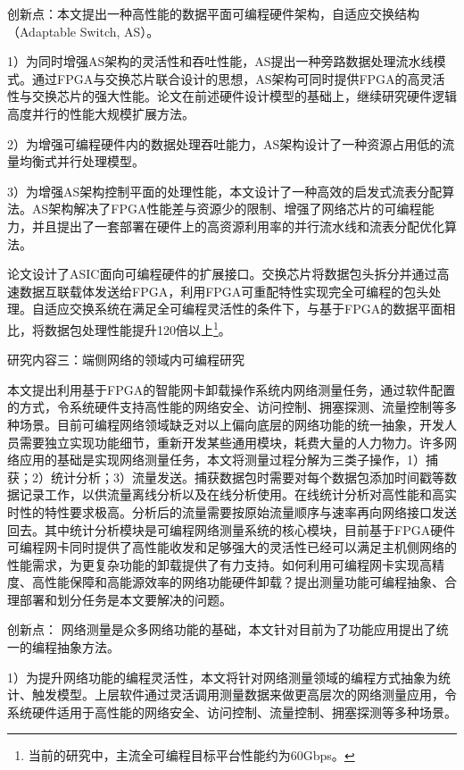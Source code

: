 {\hei 创新点：}本文提出一种高性能的数据平面可编程硬件架构，自适应交换结构（Adaptable Switch, AS）。

1）为同时增强AS架构的灵活性和吞吐性能，AS提出一种旁路数据处理流水线模式。通过FPGA与交换芯片联合设计的思想，AS架构可同时提供FPGA的高灵活性与交换芯片的强大性能。论文在前述硬件设计模型的基础上，继续研究硬件逻辑高度并行的性能大规模扩展方法。

2）为增强可编程硬件内的数据处理吞吐能力，AS架构设计了一种资源占用低的流量均衡式并行处理模型。

3）为增强AS架构控制平面的处理性能，本文设计了一种高效的启发式流表分配算法。AS架构解决了FPGA性能差与资源少的限制、增强了网络芯片的可编程能力，并且提出了一套部署在硬件上的高资源利用率的并行流水线和流表分配优化算法。

论文设计了ASIC面向可编程硬件的扩展接口。交换芯片将数据包头拆分并通过高速数据互联载体发送给FPGA，利用FPGA可重配特性实现完全可编程的包头处理。自适应交换系统在满足全可编程灵活性的条件下，与基于FPGA的数据平面相比，将数据包处理性能提升120倍以上\footnote{当前的研究中，主流全可编程目标平台性能约为60Gbps。}。

{\hei 研究内容三：端侧网络的领域内可编程研究}

{\hei 本文提出利用基于FPGA的智能网卡卸载操作系统内网络测量任务，通过软件配置的方式，令系统硬件支持高性能的网络安全、访问控制、拥塞探测、流量控制等多种场景。}目前可编程网络领域缺乏对以上偏向底层的网络功能的统一抽象，开发人员需要独立实现功能细节，重新开发某些通用模块，耗费大量的人力物力。许多网络应用的基础是实现网络测量任务，本文将测量过程分解为三类子操作，1）捕获；2）统计分析；3）流量发送。捕获数据包时需要对每个数据包添加时间戳等数据记录工作，以供流量离线分析以及在线分析使用。在线统计分析对高性能和高实时性的特性要求极高。分析后的流量需要按原始流量顺序与速率再向网络接口发送回去。其中统计分析模块是可编程网络测量系统的核心模块，目前基于FPGA硬件可编程网卡同时提供了高性能收发和足够强大的灵活性已经可以满足主机侧网络的性能需求，为更复杂功能的卸载提供了有力支持。如何利用可编程网卡实现高精度、高性能保障和高能源效率的网络功能硬件卸载？提出测量功能可编程抽象、合理部署和划分任务是本文要解决的问题。

{\hei 创新点：}
网络测量是众多网络功能的基础，本文针对目前为了功能应用提出了统一的编程抽象方法。

1）为提升网络功能的编程灵活性，本文将针对网络测量领域的编程方式抽象为统计、触发模型。上层软件通过灵活调用测量数据来做更高层次的网络测量应用，令系统硬件适用于高性能的网络安全、访问控制、流量控制、拥塞探测等多种场景。

